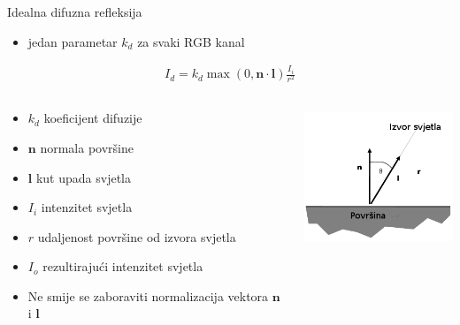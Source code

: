\documentclass[9pt]{beamer}
\begin{document}
\begin{frame}{Idealna difuzna refleksija}
	\begin{itemize}
		\item jedan parametar $k_d$ za svaki RGB kanal
	\end{itemize}
	\begin{align*}
	I_d = k_d\max (0, \mathbf{n}\cdot \mathbf{l})\frac{I_i}{r^2}
	\end{align*}
	\begin{columns}[onlytextwidth]
		\begin{column}{0.5\textwidth}
			\begin{itemize}
				\item $k_d$ koeficijent difuzije
				\item $ \mathbf{n}$ normala površine
				\item $  \mathbf{l}$ kut upada svjetla
				\item $I_i$ intenzitet svjetla
				\item $r$ udaljenost površine od izvora svjetla
				\item $I_o$ rezultirajući intenzitet svjetla
				\item \alert{Ne smije se zaboraviti normalizacija vektora $ \mathbf{n}$ i $ \mathbf{l}$ }
			\end{itemize}
		\end{column}
		\begin{column}{0.4\textwidth}
			\begin{center}
				\includegraphics[height=4cm]{slike/diffuse_refl.png}
			\end{center}
		\end{column}
	\end{columns}
	
\end{frame}	
\end{document}
